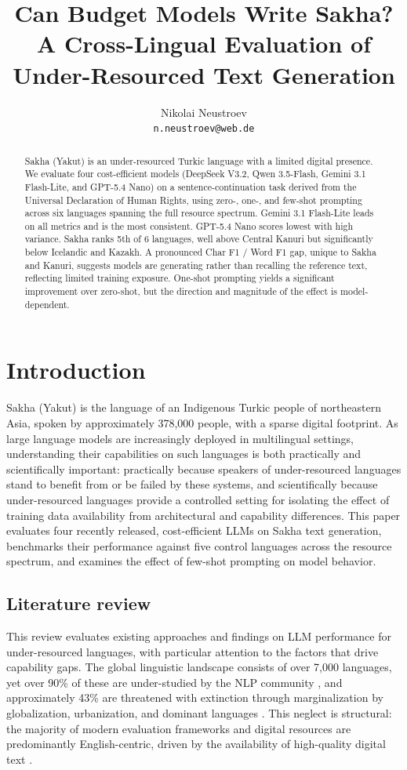 \documentclass[11pt]{article}
\title{Can Budget Models Write Sakha? A Cross-Lingual Evaluation of Under-Resourced Text Generation}
\author{Nikolai Neustroev \\
  \texttt{n.neustroev@web.de} \\}
\begin{document}
\maketitle


\begin{abstract}
Sakha (Yakut) is an under-resourced Turkic language with a limited digital presence.
We evaluate four cost-efficient models (DeepSeek V3.2, Qwen 3.5-Flash, Gemini 3.1 Flash-Lite, and GPT-5.4 Nano) on a sentence-continuation task derived from the Universal Declaration of Human Rights, using zero-, one-, and few-shot prompting across six languages spanning the full resource spectrum.
Gemini 3.1 Flash-Lite leads on all metrics and is the most consistent.
GPT-5.4 Nano scores lowest with high variance.
Sakha ranks 5th of 6 languages, well above Central Kanuri but significantly below Icelandic and Kazakh.
A pronounced Char F1 / Word F1 gap, unique to Sakha and Kanuri, suggests models are generating rather than recalling the reference text, reflecting limited training exposure.
One-shot prompting yields a significant improvement over zero-shot, but the direction and magnitude of the effect is model-dependent.
\end{abstract}


\section{Introduction}
Sakha (Yakut) is the language of an Indigenous Turkic people of northeastern Asia, spoken by approximately 378,000 people, with a sparse digital footprint.
As large language models are increasingly deployed in multilingual settings, understanding their capabilities on such languages is both practically and scientifically important: practically because speakers of under-resourced languages stand to benefit from or be failed by these systems, and scientifically because under-resourced languages provide a controlled setting for isolating the effect of training data availability from architectural and capability differences.
This paper evaluates four recently released, cost-efficient LLMs on Sakha text generation, benchmarks their performance against five control languages across the resource spectrum, and examines the effect of few-shot prompting on model behavior.

\subsection{Literature review}
This review evaluates existing approaches and findings on LLM performance for under-resourced languages, with particular attention to the factors that drive capability gaps.
The global linguistic landscape consists of over 7,000 languages, yet over 90\% of these are under-studied by the NLP community \cite{joshi-etal-2020-state}, and approximately 43\% are threatened with extinction through marginalization by globalization, urbanization, and dominant languages \cite{vasconcelos2024disappearing, zhong2026opportunitieschallengeslargelanguage}.
This neglect is structural: the majority of modern evaluation frameworks and digital resources are predominantly English-centric, driven by the availability of high-quality digital text \cite{lai-etal-2024-llms}.
\end{document}
